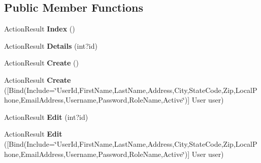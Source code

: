 \subsection*{Public Member Functions}
\begin{DoxyCompactItemize}
\item 
Action\+Result {\bfseries Index} ()\hypertarget{class_p_c_builder_m_v_c_1_1_controllers_1_1_user_controller_a2dc3bcfa12cbd3193881110bb2bcf079}{}\label{class_p_c_builder_m_v_c_1_1_controllers_1_1_user_controller_a2dc3bcfa12cbd3193881110bb2bcf079}

\item 
Action\+Result {\bfseries Details} (int?id)\hypertarget{class_p_c_builder_m_v_c_1_1_controllers_1_1_user_controller_ab4bcb8a7721fd91cd6e769a6c5f2111a}{}\label{class_p_c_builder_m_v_c_1_1_controllers_1_1_user_controller_ab4bcb8a7721fd91cd6e769a6c5f2111a}

\item 
Action\+Result {\bfseries Create} ()\hypertarget{class_p_c_builder_m_v_c_1_1_controllers_1_1_user_controller_a018c24eba9f929387f7c426c7799a1a8}{}\label{class_p_c_builder_m_v_c_1_1_controllers_1_1_user_controller_a018c24eba9f929387f7c426c7799a1a8}

\item 
Action\+Result {\bfseries Create} (\mbox{[}Bind(Include=\char`\"{}User\+Id,First\+Name,Last\+Name,Address,City,State\+Code,Zip,Local\+Phone,Email\+Address,Username,Password,Role\+Name,Active\char`\"{})\mbox{]} User user)\hypertarget{class_p_c_builder_m_v_c_1_1_controllers_1_1_user_controller_af8027c377046c4a30aaf6b0c6d80b967}{}\label{class_p_c_builder_m_v_c_1_1_controllers_1_1_user_controller_af8027c377046c4a30aaf6b0c6d80b967}

\item 
Action\+Result {\bfseries Edit} (int?id)\hypertarget{class_p_c_builder_m_v_c_1_1_controllers_1_1_user_controller_a2e149503159c884e4f0cb1c6daca1279}{}\label{class_p_c_builder_m_v_c_1_1_controllers_1_1_user_controller_a2e149503159c884e4f0cb1c6daca1279}

\item 
Action\+Result {\bfseries Edit} (\mbox{[}Bind(Include=\char`\"{}User\+Id,First\+Name,Last\+Name,Address,City,State\+Code,Zip,Local\+Phone,Email\+Address,Username,Password,Role\+Name,Active\char`\"{})\mbox{]} User user)\hypertarget{class_p_c_builder_m_v_c_1_1_controllers_1_1_user_controller_a84cf30a139a0cda5551411ee29654729}{}\label{class_p_c_builder_m_v_c_1_1_controllers_1_1_user_controller_a84cf30a139a0cda5551411ee29654729}


\end{DoxyCompactItemize}
